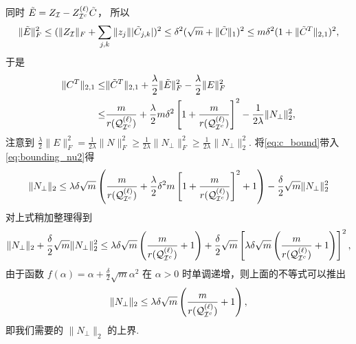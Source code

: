 同时 \(\tilde{E} = Z_{\mathcal{I}} - Z_{\mathcal{I}^c}^{(\ell)}\tilde{C}\)， 所以 
\[\|\tilde{E}\|_F^2 \leq (\|Z_{\mathcal{I}}\|_F+\sum_{j,k} \|z_j\||\tilde{C}_{j,k}|)^2
\leq \delta^2 (\sqrt{m} + \|\tilde{C}\|_1)^2\leq m \delta^2(1+ \|\tilde{C}^T\|_{2,1})^2,\]
于是
\begin{align}
  \|C^T\|_{2,1} \leq& \|\tilde{C}^T\|_{2,1} +
  \frac{\lambda}{2}\|\tilde{E}\|_F^2-\frac{\lambda}{2}\|E\|_F^2\nonumber \\
  \leq& \frac{m}{r{(\mathcal{Q}_{\mathcal{I}^c}^{(\ell)})}}+\frac{\lambda}{2}m\delta^2
  \left[1+\frac{m}{r{(\mathcal{Q}_{\mathcal{I}^c}^{(\ell)})}}\right]^2-\frac{1}{2\lambda}\|N_{\perp}\|_2^2,
  \label{eq:c_bound}
\end{align}
注意到 \(\frac{\lambda}{2}\|E\|_F^2=\frac{1}{2\lambda}\|N\|_F^2
\geq\frac{1}{2\lambda}\|N_{\perp}\|_F^2 \geq\frac{1}{2\lambda}\|N_{\perp}\|_2^2\).
将\eqref{eq:c_bound}带入 \eqref{eq:bounding_nu2}得
\[\|N_{\perp}\|_2 \leq \lambda \delta \sqrt{m} 
\left(\frac{m}{r(\mathcal{Q}_{\mathcal{I}^c}^{(\ell)})}+\frac{\lambda}{2}\delta^2m
\left[1+\frac{m}{r(\mathcal{Q}_{\mathcal{I}^c}^{(\ell)})}\right]^2+1\right)
-\frac{\delta}{2}\sqrt{m}\|N_{\perp}\|_2^2 \]
对上式稍加整理得到
\[\|N_{\perp}\|_2+\frac{\delta}{2}\sqrt{m}\|N_{\perp}\|_2^2\leq
  \lambda\delta\sqrt{m}\left(\frac{m}{r(\mathcal{Q}_{\mathcal{I}^c}^{(\ell)})}+1\right)+
  \frac{\delta}{2}\sqrt{m} \left[\lambda\delta\sqrt{m}
  \left(\frac{m}{r(\mathcal{Q}_{\mathcal{I}^c}^{(\ell)})}+1\right)\right]^2,\]
由于函数 \(f(\alpha)=\alpha+\frac{\delta}{2}\sqrt{m}\alpha^2\) 在 \(\alpha>0\)
时单调递增，则上面的不等式可以推出
\begin{equation}\label{eq:nu2_bound}
  \|N_{\perp}\|_2 \leq \lambda\delta\sqrt{m}\left(\frac{m}{r(\mathcal{Q}_{\mathcal{I}^c}^{(\ell)})}+1\right),
\end{equation}
即我们需要的 \(\|N_{\perp}\|_2\) 的上界.

